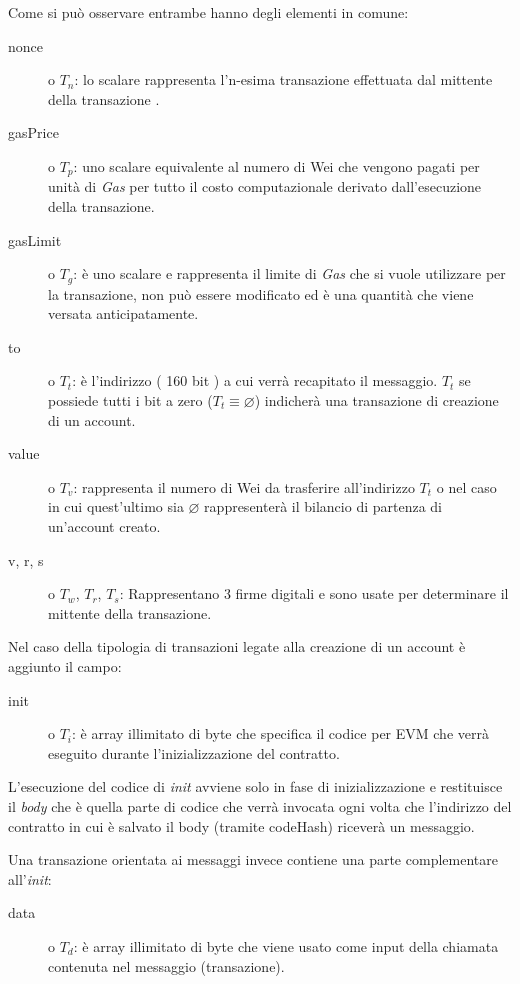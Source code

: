 	Come si può osservare entrambe hanno degli elementi in comune:
	\begin{description}
		\item[nonce] o $T_n$: lo scalare rappresenta l'n-esima transazione effettuata dal mittente della transazione .%
		\item[gasPrice] o $T_p$: uno scalare equivalente al numero di Wei che vengono pagati per unità di \textit{Gas} per tutto il costo computazionale derivato dall'esecuzione della transazione.
		\item[gasLimit] o $T_g$: è uno scalare e rappresenta il limite di \textit{Gas} che si vuole utilizzare per la transazione, non può essere modificato ed è una quantità che viene versata anticipatamente.
		\item[to] o $T_t$: è l'indirizzo ( 160 bit ) a cui verrà recapitato il messaggio. $T_t$ se possiede tutti i bit a zero ($T_t \equiv \varnothing$) indicherà una transazione di creazione di un account. 
		\item[value] o $T_v$: rappresenta il numero di Wei da trasferire all'indirizzo $T_t$ o nel caso in cui quest'ultimo sia $\varnothing$ rappresenterà il bilancio di partenza di un'account creato.
		\item[v, r, s] o $T_w$, $T_r$, $T_s$: Rappresentano 3 firme digitali e sono usate per determinare il mittente della transazione.
	\end{description}
	
	Nel caso della tipologia di transazioni legate alla creazione di un account è aggiunto il campo: 
	\begin{description}
		\item[init] o $T_i$: è array illimitato di byte che specifica il codice per EVM che verrà eseguito durante l'inizializzazione del contratto. 
	\end{description}
	L'esecuzione del codice di \textit{init} avviene solo in fase di inizializzazione e restituisce il \textit{body} che è quella parte di codice che verrà invocata ogni volta che l'indirizzo del contratto in cui è salvato il body (tramite codeHash) riceverà un messaggio.
	
	Una transazione orientata ai messaggi invece contiene una parte complementare all'\textit{init}:
	\begin{description}
		\item[data] o $T_d$: è array illimitato di byte che viene usato come input della chiamata contenuta nel messaggio (transazione).
	\end{description}
	
